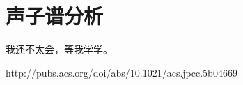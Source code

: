 \section{声子谱分析}\label{sec:声子谱分析}


我还不太会，等我学学。

http://pubs.acs.org/doi/abs/10.1021/acs.jpcc.5b04669